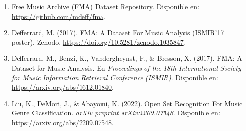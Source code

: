 \documentclass{article}
\begin{document}
\begin{enumerate}
    \item Free Music Archive (FMA) Dataset Repository. Disponible en: \url{https://github.com/mdeff/fma}.

    \item Defferrard, M. (2017). FMA: A Dataset For Music Analysis (ISMIR'17 poster). Zenodo. \url{https://doi.org/10.5281/zenodo.1035847}.

    \item Defferrard, M., Benzi, K., Vandergheynst, P., \& Bresson, X. (2017). {FMA}: A Dataset for Music Analysis. En \textit{Proceedings of the 18th International Society for Music Information Retrieval Conference (ISMIR)}. Disponible en: \url{https://arxiv.org/abs/1612.01840}.

    \item Liu, K., DeMori, J., \& Abayomi, K. (2022). Open Set Recognition For Music Genre Classification. \textit{arXiv preprint arXiv:2209.07548}. Disponible en: \url{https://arxiv.org/abs/2209.07548}.
\end{enumerate}
\end{document}
